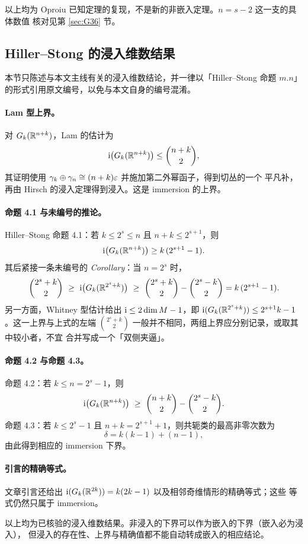 \begin{remark}
以上均为 Oproiu 已知定理的复现，不是新的非嵌入定理。$n=s-2$ 这一支的具体数值
核对见第 \ref{sec:G36} 节。
\end{remark}

\subsection{Hiller--Stong 的浸入维数结果}

本节只陈述与本文主线有关的浸入维数结论，并一律以「Hiller--Stong 命题 $m.n$」
的形式引用原文编号，以免与本文自身的编号混淆。

\paragraph{Lam 型上界。}
对 $G_k(\mathbb{R}^{n+k})$，Lam 的估计为
\begin{equation*}
  \operatorname{i}\bigl(G_k(\mathbb{R}^{n+k})\bigr)\le\binom{n+k}{2},
\end{equation*}
其证明使用 $\gamma_k\oplus\gamma_n\cong(n+k)\varepsilon$ 并施加第二外幂函子，得到切丛的一个
平凡补，再由 Hirsch 的浸入定理得到浸入。这是 immersion 的上界。

\paragraph{命题 4.1 与未编号的推论。}
Hiller--Stong 命题 4.1：若 $k\le2^{s}\le n$ 且 $n+k\le2^{s+1}$，则
\begin{equation*}
  \operatorname{i}\bigl(G_k(\mathbb{R}^{n+k})\bigr)\ge k\,(2^{s+1}-1).
\end{equation*}
其后紧接一条未编号的 \emph{Corollary}：当 $n=2^{s}$ 时，
\begin{equation*}
  \binom{2^{s}+k}{2}\ \ge\ \imdim\bigl(G_k(\R^{2^{s}+k})\bigr)\ \ge\
  \binom{2^{s}+k}{2}-\binom{2^{s}-k}{2}=k\,(2^{s+1}-1).
\end{equation*}
另一方面，Whitney 型估计给出 $\operatorname{i}\le2\dim M-1$，即
$\operatorname{i}(G_k(\mathbb{R}^{2^{s}+k}))\le2^{s+1}k-1$。这一上界与上式的左端
$\binom{2^{s}+k}{2}$ 一般并不相同，两组上界应分别记录，或取其中较小者，不宜
合并写成一个「双侧夹逼」。

\paragraph{命题 4.2 与命题 4.3。}
命题 4.2：若 $k\le n=2^{s}-1$，则
\begin{equation*}
  \operatorname{i}\bigl(G_k(\mathbb{R}^{n+k})\bigr)\ \ge\
  \binom{n+k}{2}-\binom{2^{s}-k}{2}.
\end{equation*}
命题 4.3：若 $k\le2^{s}-1$ 且 $n+k=2^{s+1}+1$，则共轭类的最高非零次数为
\begin{equation*}
  \delta=k(k-1)+(n-1),
\end{equation*}
由此得到相应的 immersion 下界。

\paragraph{引言的精确等式。}
文章引言还给出 $\operatorname{i}(G_k(\mathbb{R}^{2k}))=k(2k-1)$ 以及相邻奇维情形的精确等式；这些
等式仍然只属于 immersion。

\begin{remark}
以上均为已核验的浸入维数结果。非浸入的下界可以作为嵌入的下界（嵌入必为浸入），
但浸入的存在性、上界与精确值都不能自动转成嵌入的相应结论。
\end{remark}
